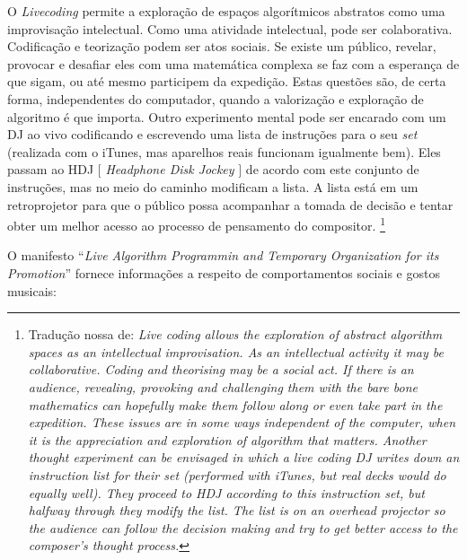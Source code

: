 \begin{citacao}
O \emph{Livecoding} permite a exploração de espaços algorítmicos abstratos como uma improvisação intelectual. Como uma atividade intelectual, pode ser colaborativa. Codificação e teorização podem ser atos sociais. Se existe um público, revelar, provocar e desafiar eles com uma matemática complexa se faz com a esperança de que sigam, ou até mesmo participem da expedição. Estas questões são, de certa forma, independentes do computador, quando a valorização e exploração de algoritmo é que importa. Outro experimento mental pode ser encarado com um DJ ao vivo codificando e escrevendo uma lista de instruções para o seu \emph{set} (realizada com o iTunes, mas aparelhos reais funcionam igualmente bem). Eles passam ao HDJ $[$ \emph{Headphone Disk Jockey} $]$ de acordo com este conjunto de instruções, mas no meio do caminho modificam a lista. A lista está em um retroprojetor para que o público possa acompanhar a tomada de decisão e tentar obter um melhor acesso ao processo de pensamento do compositor. \cite[p.~245]{ward_live_2004} \footnote{Tradução nossa de: \emph{Live coding allows the exploration of abstract algorithm spaces as an intellectual improvisation. As an intellectual activity it may be collaborative. Coding and theorising may be a social act. If there is an audience, revealing, provoking and challenging them with the bare bone mathematics can hopefully make them follow along or even take part in the expedition. These issues are in some ways independent of the computer, when it is the appreciation and exploration of algorithm that matters.   Another thought experiment can be envisaged in which a live coding DJ writes down an instruction list for their set (performed with iTunes, but real decks would do equally well). They proceed to HDJ according to this instruction set, but halfway through they modify the list. The list is on an overhead projector so the audience can follow the decision making and try to get better access to the composer’s thought process.}}
\end{citacao}

O manifesto ``\emph{Live Algorithm Programmin and Temporary Organization for its Promotion}'' \cite{ward_live_2004} fornece informações a respeito de comportamentos sociais e gostos musicais:

